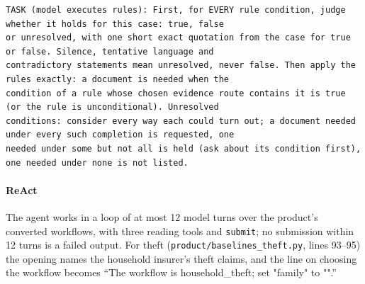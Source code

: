 \begin{lstlisting}[title={\textbf{Model executes rules, theft: task} (\texttt{product/baselines\_theft.py}, lines 69--74, verbatim)}]
TASK (model executes rules): First, for EVERY rule condition, judge whether it holds for this case: true, false
or unresolved, with one short exact quotation from the case for true or false. Silence, tentative language and
contradictory statements mean unresolved, never false. Then apply the rules exactly: a document is needed when the
condition of a rule whose chosen evidence route contains it is true (or the rule is unconditional). Unresolved
conditions: consider every way each could turn out; a document needed under every such completion is requested, one
needed under some but not all is held (ask about its condition first), one needed under none is not listed.
\end{lstlisting}

\paragraph{ReAct}
The agent works in a loop of at most 12 model turns over the product's converted workflows, with three reading tools and \texttt{submit}; no submission within 12 turns is a failed output. For theft (\texttt{product/\allowbreak{}baselines\_theft.py}, lines 93--95) the opening names the household insurer's theft claims, and the line on choosing the workflow becomes ``The workflow is household\_theft; set "family" to "".''


